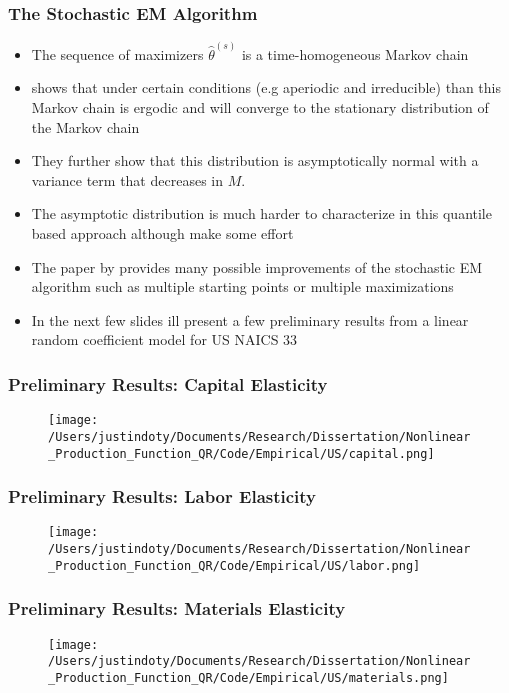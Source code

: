 \documentclass{beamer}
\begin{document}
\begin{frame}
\frametitle{The Stochastic EM Algorithm}
\begin{itemize}
	\item The sequence of maximizers $\hat{\theta}^{(s)}$ is a time-homogeneous Markov chain
	\item \cite{Nielsen2000} shows that under certain conditions (e.g aperiodic and irreducible) than this Markov chain is ergodic and will converge to the stationary distribution of the Markov chain
	\item They further show that this distribution is asymptotically normal with a variance term that decreases in $M$.
	\item The asymptotic distribution is much harder to characterize in this quantile based approach although \cite{Arellano2016} make some effort
	\item The paper by \cite{Nielsen2000} provides many possible improvements of the stochastic EM algorithm such as multiple starting points or multiple maximizations 
	\item In the next few slides ill present a few preliminary results from a linear random coefficient model for US NAICS 33
\end{itemize}
\end{frame}

\begin{frame}
\frametitle{Preliminary Results: Capital Elasticity}
\begin{figure}[ht]
\centering
\texttt{[image: /Users/justindoty/Documents/Research/Dissertation/Nonlinear\_Production\_Function\_QR/Code/Empirical/US/capital.png]}
\end{figure}
\end{frame}

\begin{frame}
\frametitle{Preliminary Results: Labor Elasticity}
\begin{figure}[ht]
\centering
\texttt{[image: /Users/justindoty/Documents/Research/Dissertation/Nonlinear\_Production\_Function\_QR/Code/Empirical/US/labor.png]}
\end{figure}
\end{frame}

\begin{frame}
\frametitle{Preliminary Results: Materials Elasticity}
\begin{figure}[ht]
\centering
\texttt{[image: /Users/justindoty/Documents/Research/Dissertation/Nonlinear\_Production\_Function\_QR/Code/Empirical/US/materials.png]}
\end{figure}
\end{frame}
\end{document}
